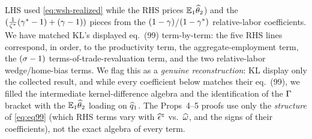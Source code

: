 {LHS used \eqref{eq:wsh-realized} while the RHS prices $\mathbb{E}_1\widehat{\theta}_2$) and the
$(\frac{1}{\zeta^{*}}(\gamma^{*}-1)+(\gamma-1))$ pieces from the $(1-\gamma)$/$(1-\gamma^{*})$
relative-labor coefficients. We have matched KL's displayed eq.~(99)
term-by-term: the five RHS lines correspond, in order, to the productivity term,
the aggregate-employment term, the $(\sigma-1)$ terms-of-trade-revaluation term,
and the two relative-labor wedge/home-bias terms. We flag this as a \emph{genuine
reconstruction}: KL display only the collected result, and while every
coefficient below matches their eq.~(99), we filled the intermediate
kernel-difference algebra and the identification of the $\Gamma$ bracket with the
$\mathbb{E}_1\widehat{\theta}_2$ loading on $\widehat{q}_1$. The Props~4--5 proofs use only the
\emph{structure} of \eqref{eq:eq99} (which RHS terms vary with $\widehat{\epsilon}^z$
vs.\ $\widehat{\omega}$, and the signs of their coefficients), not the exact algebra of
every term.}

